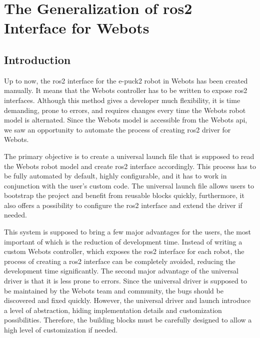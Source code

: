 \chapter{The Generalization of \ac{ros2} Interface for Webots}
\label{chap:generalization}


\section{Introduction}
\label{sec:generalization:introduction}

Up to now, the \ac{ros2} interface for the e-puck2 robot in Webots has been created manually.
It means that the Webots controller has to be written to expose \ac{ros2} interfaces.
Although this method gives a developer much flexibility, it is time demanding, prone to errors, and requires changes every time the Webots robot model is alternated.
Since the Webots model is accessible from the Webots \ac{api}, we saw an opportunity to automate the process of creating \ac{ros2} driver for Webots.

The primary objective is to create a universal launch file that is supposed to read the Webots robot model and create \ac{ros2} interface accordingly.
This process has to be fully automated by default, highly configurable, and it has to work in conjunction with the user's custom code.
The universal launch file allows users to bootstrap the project and benefit from reusable blocks quickly, furthermore, it also offers a possibility to configure the \ac{ros2} interface and extend the driver if needed.

This system is supposed to bring a few major advantages for the users, the most important of which is the reduction of development time.
Instead of writing a custom Webots controller, which exposes the \ac{ros2} interface for each robot, the process of creating a \ac{ros2} interface can be completely avoided, reducing the development time significantly.
The second major advantage of the universal driver is that it is less prone to errors.
Since the universal driver is supposed to be maintained by the Webots team and community, the bugs should be discovered and fixed quickly.
However, the universal driver and launch introduce a level of abstraction, hiding implementation details and customization possibilities.
Therefore, the building blocks must be carefully designed to allow a high level of customization if needed.

